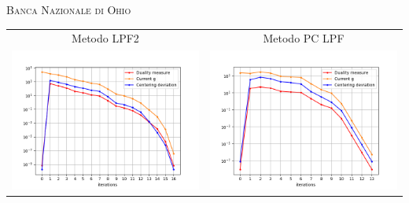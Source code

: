 
\begin{frame}{\textsc{\LARGE \textcolor{iris}{Banca Nazionale di Ohio}}}
	\centering
	\begin{tabular}{c@{}c}
		\small{Metodo LPF2} & \small{Metodo PC LPF} \\
		\includegraphics[scale = 0.33]{onb_LPF2}
		&\includegraphics[scale = 0.33]{onb_MER2}\\ 
	\end{tabular}
\end{frame}

